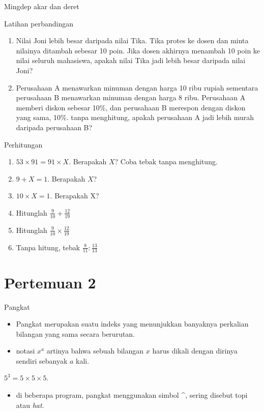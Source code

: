 \documentclass[
  ignorenonframetext,
]{beamer}
\providecommand{\tightlist}{%
  \setlength{\itemsep}{0pt}\setlength{\parskip}{0pt}}\usepackage{longtable,booktabs,array}
\begin{document}
\begin{frame}{Mingdep}
\label{mingdep}
akar dan deret
\end{frame}

\begin{frame}{Latihan perbandingan}
\label{latihan-perbandingan}
\begin{enumerate}
\item
  Nilai Joni lebih besar daripada nilai Tika. Tika protes ke dosen dan
  minta nilainya ditambah sebesar 10 poin. Jika dosen akhirnya menambah
  10 poin ke nilai seluruh mahasiswa, apakah nilai Tika jadi lebih besar
  daripada nilai Joni?
\item
  Perusahaan A menawarkan minuman dengan harga 10 ribu rupiah sementara
  perusahaan B menawarkan minuman dengan harga 8 ribu. Perusahaan A
  memberi diskon sebesar 10\%, dan perusahaan B merespon dengan diskon
  yang sama, 10\%. tanpa menghitung, apakah perusahaan A jadi lebih
  murah daripada perusahaan B?
\end{enumerate}
\end{frame}

\begin{frame}{Perhitungan}
\label{perhitungan}
\begin{enumerate}
\item
  \(53 \times 91 = 91 \times X\). Berapakah \(X\)? Coba tebak tanpa
  menghitung.
\item
  \(9+X=1\). Berapakah \(X\)?
\item
  \(10 \times X = 1\). Berapakah X?
\item
  Hitunglah \(\frac{9}{10}+\frac{12}{19}\)
\item
  Hitunglah \(\frac{9}{10} \times \frac{12}{19}\)
\item
  Tanpa hitung, tebak \(\frac{8}{11} : \frac{13}{13}\)
\end{enumerate}
\end{frame}

\section{Pertemuan 2}\label{pertemuan-2}

\begin{frame}{Pangkat}
\label{pangkat}
\begin{itemize}
\item
  Pangkat merupakan suatu indeks yang menunjukkan banyaknya perkalian
  bilangan yang sama secara berurutan.
\item
  notasi \(x^a\) artinya bahwa sebuah bilangan \(x\) harus dikali dengan
  dirinya sendiri sebanyak \(a\) kali.
\end{itemize}

\(5^3=5 \times 5 \times 5\).

\begin{itemize}
\tightlist
\item
  di beberapa program, pangkat menggunakan simbol \(\^\), sering disebut
  topi atau \emph{hat}.
\end{itemize}
\end{frame}
\end{document}
